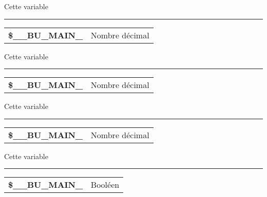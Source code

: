 \documentclass[a4paper,10pt]{article}
\begin{document}
\begin{justify}
    Cette variable
\end{justify}


\par\noindent\rule{\textwidth}{0.4pt}

\begin{justify}
    \begin{tabular}{l|l}
        \textbf{\color{vars}\$\_\_BU\_MAIN\_}   & Nombre décimal\\[1\baselineskip]
    \end{tabular}
\end{justify}

\begin{justify}
    Cette variable
\end{justify}


\par\noindent\rule{\textwidth}{0.4pt}

\begin{justify}
    \begin{tabular}{l|l}
        \textbf{\color{vars}\$\_\_BU\_MAIN\_}  & Nombre décimal\\[1\baselineskip]
    \end{tabular}
\end{justify}

\begin{justify}
    Cette variable
\end{justify}


\par\noindent\rule{\textwidth}{0.4pt}

\begin{justify}
    \begin{tabular}{l|l}
        \textbf{\color{vars}\$\_\_BU\_MAIN\_}  & Nombre décimal\\[1\baselineskip]
    \end{tabular}
\end{justify}

\begin{justify}
    Cette variable
\end{justify}


\par\noindent\rule{\textwidth}{0.4pt}

\begin{justify}
    \begin{tabular}{l|l}
        \textbf{\color{vars}\$\_\_BU\_MAIN\_}   & Booléen \\[1\baselineskip]
    \end{tabular}
\end{justify}
\end{document}
